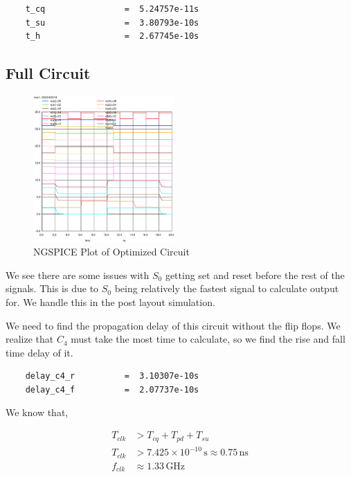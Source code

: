 \documentclass[conference]{IEEEtran}
\begin{document}
\begin{verbatim}
    t_cq                =  5.24757e-11s
    t_su                =  3.80793e-10s
    t_h                 =  2.67745e-10s
\end{verbatim}

\subsection{Full Circuit}

\begin{figure}[H]
    \centering
    \includegraphics[width=0.48\textwidth]{images/full_optimized_tran.eps}
    \caption{NGSPICE Plot of Optimized Circuit}
\end{figure}

We see there are some issues with $S_0$ getting set and reset before the rest of the signals. This is due to $S_0$ being relatively the fastest signal to calculate output for. We handle this in the post layout simulation.

We need to find the propagation delay of this circuit without the flip flops. We realize that $C_4$ must take the most time to calculate, so we find the rise and fall time delay of it.

\begin{verbatim}
    delay_c4_r          =  3.10307e-10s
    delay_c4_f          =  2.07737e-10s  
\end{verbatim}

We know that,

\begin{align}
    T_{clk} &> T_{cq} + T_{pd} + T_{su} \\
    T_{clk} &> 7.425 \times 10^{-10} \, \text{s} \approx 0.75 \, \text{ns} \\
    f_{clk} &\approx 1.33 \, \text{GHz}
\end{align}
\end{document}
